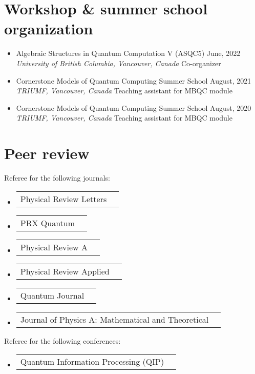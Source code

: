 \documentclass[letterpaper,11pt]{article}
\makeatletter
\newcommand{\OrganizerItem}[4]{
	\item{\parbox{0.97\textwidth}{
			{#1} \hfill {#2}\\
			\emph{#3} \hfill {#4}
		}}
}
\newcommand{\AwardsItem}[2]{
	\item{\vspace{-1pt}
		\begin{tabular*}{0.97\textwidth}{l@{\extracolsep{\fill}}r}
			{#1} & {#2}
		\end{tabular*}
		\vspace{-5pt}
	}
}
\newcommand{\SkillsItem}[2]{
	\item{\vspace{-1pt}
		\begin{tabular*}{0.97\textwidth}{l l}
			{#1:} & {#2}
		\end{tabular*}
		\vspace{-5pt}
	}
}
\makeatother
\begin{document}
\section*{Workshop \& summer school organization}
\begin{itemize}[leftmargin=*]
	\OrganizerItem{Algebraic Structures in Quantum Computation V (ASQC5)}{June, 2022}{University of British Columbia, Vancouver, Canada}{Co-organizer}
	\OrganizerItem{Cornerstone Models of Quantum Computing Summer School}{August, 2021}{TRIUMF, Vancouver, Canada}{Teaching assistant for MBQC module}
	\OrganizerItem{Cornerstone Models of Quantum Computing Summer School}{August, 2020}{TRIUMF, Vancouver, Canada}{Teaching assistant for MBQC module}
\end{itemize}

\section*{Peer review}
Referee for the following journals:\vspace{-2mm}
\begin{itemize}[leftmargin=*]
	\AwardsItem{Physical Review Letters}{}
	\AwardsItem{PRX Quantum}{}
	\AwardsItem{Physical Review A}{}
	\AwardsItem{Physical Review Applied}{}
	\AwardsItem{Quantum Journal}{}
	\AwardsItem{Journal of Physics A: Mathematical and Theoretical}{}
\end{itemize}
Referee for the following conferences:\vspace{-2mm}
\begin{itemize}[leftmargin=*]
	\AwardsItem{Quantum Information Processing (QIP)}{}
\end{itemize}



\end{document}
